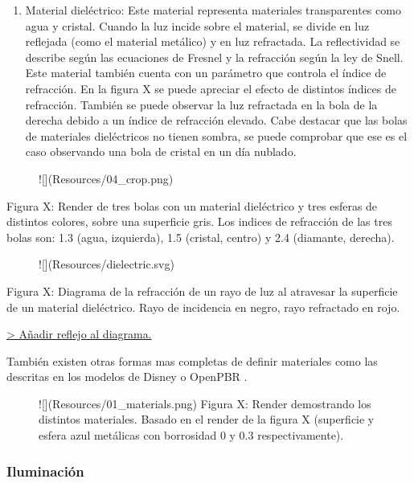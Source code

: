 \documentclass[10pt, a4paper]{article}
\begin{document}
\begin{enumerate}
\item Material dieléctrico: Este material representa materiales transparentes como agua y cristal. Cuando la luz incide sobre el material, se divide en luz reflejada (como el material metálico) y en luz refractada. La reflectividad se describe según las ecuaciones de Fresnel y la refracción según la ley de Snell. Este material también cuenta con un parámetro que controla el índice de refracción. En la figura X se puede apreciar el efecto de distintos índices de refracción. También se puede observar la luz refractada en la bola de la derecha debido a un índice de refracción elevado. Cabe destacar que las bolas de materiales dieléctricos no tienen sombra, se puede comprobar que ese es el caso observando una bola de cristal en un día nublado.
\end{enumerate}


\begin{figure}[h] 
![](Resources/04_crop.png)
\end{figure}

Figura X: Render de tres bolas con un material dieléctrico y tres esferas de distintos colores, sobre una superficie gris. Los indices de refracción de las tres bolas son: 1.3 (agua, izquierda), 1.5 (cristal, centro) y 2.4 (diamante, derecha).

\begin{figure}[h] 
![](Resources/dielectric.svg)
\end{figure}

Figura X: Diagrama de la refracción de un rayo de luz al atravesar la superficie de un material dieléctrico. Rayo de incidencia en negro, rayo refractado en rojo.

\underline{> Añadir reflejo al diagrama.}

También existen otras formas mas completas de definir materiales como las descritas en los modelos de Disney \cite{Burley:2012} o OpenPBR \cite{Academy-Software-Foundation:2024}.

\begin{figure}[h] 
![](Resources/01_materials.png)
Figura X: Render demostrando los distintos materiales. Basado en el render de la figura X (superficie y esfera azul metálicas con borrosidad 0 y 0.3 respectivamente).
\end{figure}

\subsubsection{Iluminación}
\end{document}
